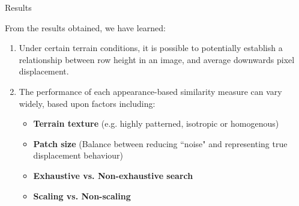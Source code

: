 \documentclass[10pt, compress]{beamer}
\begin{document}
%
%
%
%  
%  
%  		
%


\begin{frame}{Results}

From the results obtained, we have learned:

\begin{enumerate}[label={\arabic*.}]
  \item Under certain terrain conditions, it is possible to potentially establish a relationship between row height in an image, and average downwards pixel displacement. \vspace{0.5cm} 
  \item The performance of each appearance-based similarity measure can vary widely, based upon factors including:
 \vspace{0.2cm} 
  \begin{itemize}[label={\textbullet}]
  	\item \textbf{Terrain texture} (e.g. highly patterned, isotropic or homogenous)
  	\item \textbf{Patch size} (Balance between reducing ``noise" and representing true displacement behaviour)
  	\item \textbf{Exhaustive vs. Non-exhaustive search}
  	\item \textbf{Scaling vs. Non-scaling}
  \end{itemize}
\end{enumerate}

\end{frame}
\end{document}
